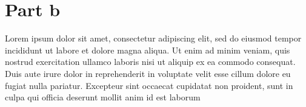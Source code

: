 \documentclass[12pt]{article}
\begin{document}
\section*{Part b}

Lorem ipsum dolor sit amet, consectetur adipiscing elit, sed do eiusmod tempor incididunt ut labore et dolore magna aliqua. Ut enim ad minim veniam, quis nostrud exercitation ullamco laboris nisi ut aliquip ex ea commodo consequat. Duis aute irure dolor in reprehenderit in voluptate velit esse cillum dolore eu fugiat nulla pariatur. Excepteur sint occaecat cupidatat non proident, sunt in culpa qui officia deserunt mollit anim id est laborum
\end{document}
